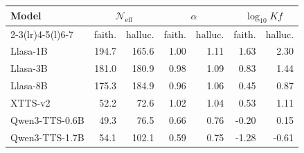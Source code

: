 \begin{tabular}{lrrrrrr}
\toprule
Model & \multicolumn{2}{c}{$\mathcal{N}_{\mathrm{eff}}$} & \multicolumn{2}{c}{$\alpha$} & \multicolumn{2}{c}{$\log_{10} Kf$} \\
\cmidrule(lr){2-3}\cmidrule(lr){4-5}\cmidrule(l){6-7}
 & faith. & halluc. & faith. & halluc. & faith. & halluc. \\
\midrule
Llasa-1B & 194.7 & 165.6 & 1.00 & 1.11 & 1.63 & 2.30 \\
Llasa-3B & 181.0 & 180.9 & 0.98 & 1.09 & 0.83 & 1.44 \\
Llasa-8B & 175.3 & 184.9 & 0.96 & 1.06 & 0.45 & 0.87 \\
XTTS-v2 & 52.2 & 72.6 & 1.02 & 1.04 & 0.53 & 1.11 \\
Qwen3-TTS-0.6B & 49.3 & 76.5 & 0.66 & 0.76 & -0.20 & 0.15 \\
Qwen3-TTS-1.7B & 54.1 & 102.1 & 0.59 & 0.75 & -1.28 & -0.61 \\
\bottomrule
\end{tabular}
